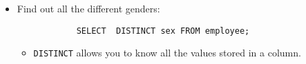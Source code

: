 \begin{itemize}
    \item Find out all the different genders:
        \begin{verbatim}
            SELECT  DISTINCT sex FROM employee;
        \end{verbatim}
        \begin{itemize}
            \item \texttt{DISTINCT} allows you to know all the values stored in a column. 
        \end{itemize}
\end{itemize}

